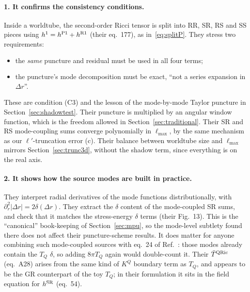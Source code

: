 \documentclass[11pt,a4paper]{article}
\begin{document}
\paragraph{1. It confirms the consistency conditions.}
Inside a worldtube, the second-order Ricci tensor is split into RR, SR, RS and SS pieces using $h^1=h^{\rm P1}+h^{\rm R1}$ (their eq.~177), as in~\eqref{eq:splitP}.
They stress two requirements:
\begin{itemize}[nosep]
\item the \emph{same} puncture and residual must be used in all four terms;
\item the puncture's mode decomposition must be exact, ``not a series expansion in $\Delta r$''.
\end{itemize}
These are condition (C3) and the lesson of the mode-by-mode Taylor puncture in Section~\ref{sec:shadowtest}.
Their puncture is multiplied by an angular window function, which is the freedom allowed in Section~\ref{sec:traditional}.
Their SR and RS mode-coupling sums converge polynomially in $\ell_{\max}$, by the same mechanism as our $\ell'$-truncation error (c).
Their balance between worldtube size and $\ell_{\max}$ mirrors Section~\ref{sec:trunc3d}, without the shadow term, since everything is on the real axis.

\paragraph{2. It shows how the source modes are built in practice.}
They interpret radial derivatives of the mode functions distributionally, with $\partial_r^2|\Delta r|=2\delta(\Delta r)$.
They extract the $\delta$ content of the mode-coupled SR sums, and check that it matches the stress-energy $\delta$ terms (their Fig.~13).
This is the ``canonical'' book-keeping of Section~\ref{sec:mpu}, so the mode-level subtlety found there does not affect their puncture-scheme results.
It does matter for anyone combining such mode-coupled sources with eq.~24 of Ref.~\cite{MusaeusPoundUpton2026}: those modes already contain the $T_Q$ $\delta$, so adding $8\pi T_Q$ again would double-count it.
Their $\bar T^{\rm QRic}$ (eq.~A28) arises from the same kind of $K^Q$ boundary term as $T_Q$, and appears to be the GR counterpart of the toy $T_Q$; in their formulation it sits in the field equation for $h^{\rm SR}$ (eq.~54).
\end{document}

